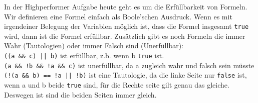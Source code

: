 \documentclass{../../sheet}
\begin{document}
\newpage
{}
In der Highperformer Aufgabe heute geht es um die Erfüllbarkeit von Formeln. Wir definieren eine Formel einfach als Boole'schen Ausdruck. Wenn es mit irgendeiner Belegung der Variablen möglich ist, dass die Formel insgesamt \texttt{true} wird, dann ist die Formel erfüllbar. Zusätzlich gibt es noch Formeln die immer Wahr (Tautologien) oder immer Falsch sind (Unerfüllbar):\\
\texttt{((a \&\& c) || b)} ist erfüllbar, z.b. wenn b \texttt{true} ist.\\
\texttt{(a \&\& !b \&\& !a \&\& c)} ist unerfüllbar, da a zugleich wahr und falsch sein müsste\\
\texttt{(!(a \&\& b) == !a || !b)} ist eine Tautologie, da die linke Seite nur \texttt{false} ist, wenn a und b beide \texttt{true} sind, für die Rechte seite gilt genau das gleiche. Deswegen ist sind die beiden Seiten immer gleich.
\end{document}
